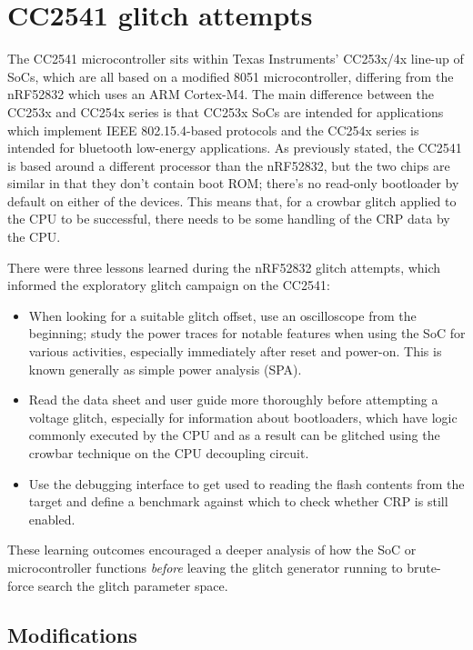 \hypertarget{cc2541-glitch-attempts}{%
\section{CC2541 glitch attempts}\label{cc2541-glitch-attempts}}

The CC2541 microcontroller sits within Texas Instruments' CC253x/4x
line-up of SoCs, which are all based on a modified 8051 microcontroller,
differing from the nRF52832 which uses an ARM Cortex-M4. The main
difference between the CC253x and CC254x series is that CC253x SoCs are
intended for applications which implement IEEE 802.15.4-based protocols
and the CC254x series is intended for bluetooth low-energy applications.
As previously stated, the CC2541 is based around a different processor
than the nRF52832, but the two chips are similar in that they don't
contain boot ROM; there's no read-only bootloader by default on either
of the devices. This means that, for a crowbar glitch applied to the CPU
to be successful, there needs to be some handling of the CRP data by the
CPU.

There were three lessons learned during the nRF52832 glitch attempts,
which informed the exploratory glitch campaign on the CC2541:

\begin{itemize}
\tightlist
\item
  When looking for a suitable glitch offset, use an oscilloscope from
  the beginning; study the power traces for notable features when using
  the SoC for various activities, especially immediately after reset and
  power-on. This is known generally as simple power analysis (SPA).
\item
  Read the data sheet and user guide more thoroughly before attempting a
  voltage glitch, especially for information about bootloaders, which
  have logic commonly executed by the CPU and as a result can be
  glitched using the crowbar technique on the CPU decoupling circuit.
\item
  Use the debugging interface to get used to reading the flash contents
  from the target and define a benchmark against which to check whether
  CRP is still enabled.
\end{itemize}

These learning outcomes encouraged a deeper analysis of how the SoC or
microcontroller functions \emph{before} leaving the glitch generator
running to brute-force search the glitch parameter space.

\hypertarget{modifications-1}{%
\subsection{Modifications}\label{modifications-1}}

